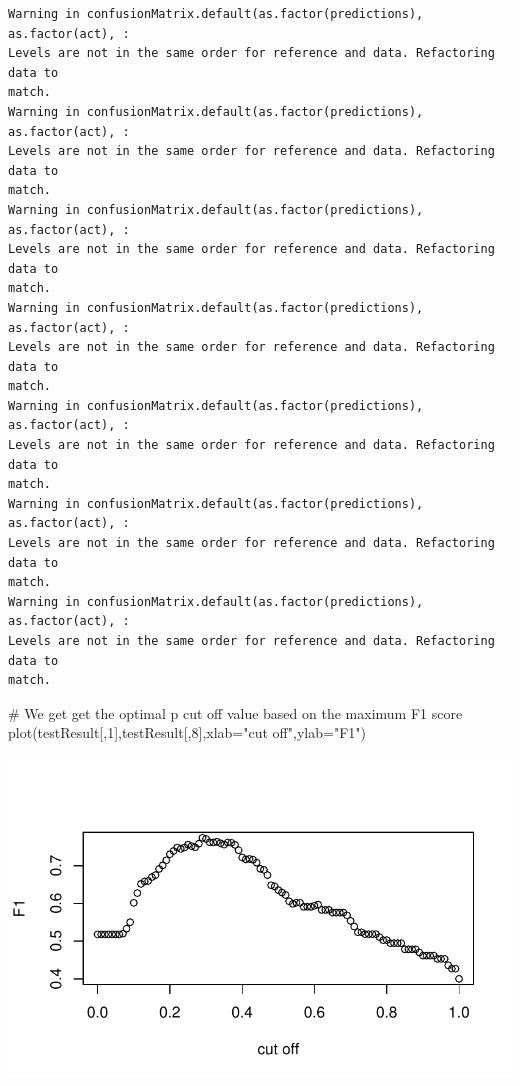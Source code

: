 \documentclass[
  letterpaper,
  DIV=11,
  numbers=noendperiod]{scrartcl}
\newenvironment{Shaded}{\begin{snugshade}}{\end{snugshade}}
\newcommand{\AttributeTok}[1]{\textcolor[rgb]{0.40,0.45,0.13}{#1}}
\newcommand{\CommentTok}[1]{\textcolor[rgb]{0.37,0.37,0.37}{#1}}
\newcommand{\DecValTok}[1]{\textcolor[rgb]{0.68,0.00,0.00}{#1}}
\newcommand{\FunctionTok}[1]{\textcolor[rgb]{0.28,0.35,0.67}{#1}}
\newcommand{\NormalTok}[1]{\textcolor[rgb]{0.00,0.23,0.31}{#1}}
\newcommand{\StringTok}[1]{\textcolor[rgb]{0.13,0.47,0.30}{#1}}
\begin{document}
\begin{verbatim}
Warning in confusionMatrix.default(as.factor(predictions), as.factor(act), :
Levels are not in the same order for reference and data. Refactoring data to
match.
Warning in confusionMatrix.default(as.factor(predictions), as.factor(act), :
Levels are not in the same order for reference and data. Refactoring data to
match.
Warning in confusionMatrix.default(as.factor(predictions), as.factor(act), :
Levels are not in the same order for reference and data. Refactoring data to
match.
Warning in confusionMatrix.default(as.factor(predictions), as.factor(act), :
Levels are not in the same order for reference and data. Refactoring data to
match.
Warning in confusionMatrix.default(as.factor(predictions), as.factor(act), :
Levels are not in the same order for reference and data. Refactoring data to
match.
Warning in confusionMatrix.default(as.factor(predictions), as.factor(act), :
Levels are not in the same order for reference and data. Refactoring data to
match.
Warning in confusionMatrix.default(as.factor(predictions), as.factor(act), :
Levels are not in the same order for reference and data. Refactoring data to
match.
\end{verbatim}

\begin{Shaded}
\begin{Highlighting}[]
\CommentTok{\# We get get the optimal p cut off value based on the maximum F1 score}
\FunctionTok{plot}\NormalTok{(testResult[,}\DecValTok{1}\NormalTok{],testResult[,}\DecValTok{8}\NormalTok{],}\AttributeTok{xlab=}\StringTok{"cut off"}\NormalTok{,}\AttributeTok{ylab=}\StringTok{"F1"}\NormalTok{)}
\end{Highlighting}
\end{Shaded}

\includegraphics{FinalProject_files/figure-pdf/poisson-1.pdf}
\end{document}
